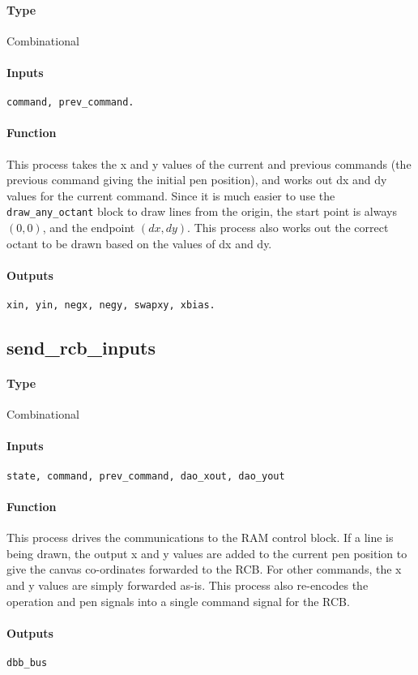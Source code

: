 \documentclass[12pt]{article}
\begin{document}
\paragraph{Type}
Combinational
\paragraph{Inputs}
\verb|command, prev_command.|
\paragraph{Function}
This process takes the x and y values of the current and previous
commands (the previous command giving the initial pen position), and
works out dx and dy values for the current command. Since it is much
easier to use the \verb|draw_any_octant| block to draw lines from the
origin, the start point is always $(0, 0)$, and the endpoint $(dx,
dy)$. This process also works out the correct octant to be drawn based
on the values of dx and dy.
\paragraph{Outputs}
\verb|xin, yin, negx, negy, swapxy, xbias.|

\subsection{send\_rcb\_inputs}
\paragraph{Type}
Combinational
\paragraph{Inputs}
\verb|state, command, prev_command, dao_xout, dao_yout|
\paragraph{Function}
This process drives the communications to the RAM control block. If a
line is being drawn, the output x and y values are added to the
current pen position to give the canvas co-ordinates forwarded to the
RCB. For other commands, the x and y values are simply forwarded
as-is. This process also re-encodes the operation and pen signals into
a single command signal for the RCB.
\paragraph{Outputs}
\verb|dbb_bus|
\end{document}
